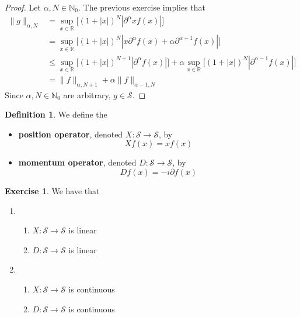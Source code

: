 \documentclass[12pt]{amsart}
\theoremstyle{definition}
\newtheorem{defn}[definition]{Definition}
\newtheorem{ex}[definition]{Exercise}
\newcommand{\p}{\partial}
\newcommand{\al}{\alpha}
\newcommand{\N}{\mathbb{N}}
\newcommand{\R}{\mathbb{R}}
\newcommand{\MS}{\mathcal{S}}
\begin{document}
	\begin{proof}
		Let $\al, N \in \N_0$. The previous exercise implies that  
		\begin{align*}
			\|g\|_{\al, N}
			&= \sup_{x \in \R}\bigg[ (1 + |x|)^N|\p^{\al} xf(x)| \bigg] \\
			& = \sup_{x \in \R}\bigg[ (1 + |x|)^N|x\p^{\al}f(x) + \al \p^{\al -1} f(x)| \bigg] \\
			& \leq \sup_{x \in \R}\bigg[ (1 + |x|)^{N+1}|\p^{\al}f(x)| \bigg] + \al \sup_{x \in \R}\bigg[  (1 + |x|)^N |\p^{\al-1} f(x)| \bigg] \\
			&= \|f\|_{\al, N+1} + \al \|f\|_{\al-1, N}
		\end{align*}
		Since $\al, N \in \N_0$ are arbitrary, $g \in \MS$.
	\end{proof}

	\begin{defn}
		We define the 
		\begin{itemize}
			\item \textbf{position operator}, denoted $X: \MS \rightarrow \MS$, by 
			$$Xf (x) = xf(x)$$
			\item \textbf{momentum operator}, denoted $D: \MS \rightarrow \MS$, by 
			$$Df (x) = -i\p f(x)$$
		\end{itemize} 
	\end{defn}

	\begin{ex}
		We have that 
		\begin{enumerate}
			\item 
			\begin{enumerate}
				\item $X: \MS \rightarrow \MS$ is linear
				\item $D: \MS \rightarrow \MS$ is linear
			\end{enumerate}
			\item 
			\begin{enumerate}
				\item $X: \MS \rightarrow \MS$ is continuous 
				\item $D: \MS \rightarrow \MS$ is continuous
			\end{enumerate}
		\end{enumerate}
	\end{ex}
\end{document}
